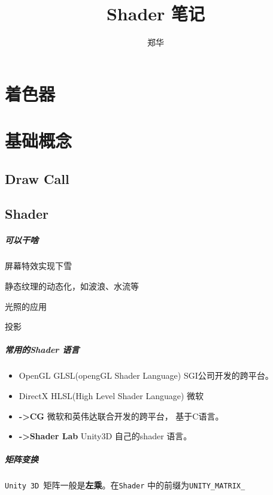 \documentclass[UTF8,a4paper,12pt]{ctexbook}
\author{\kaishu 郑华}
\title{\heiti Shader 笔记}
\begin{document}
 	\maketitle
	\tableofcontents 

\chapter{着色器}
	
	
	
				
\chapter{基础概念}
	
	\section{Draw Call}	

	\section{Shader}
		\paragraph{可以干啥}
		
			屏幕特效实现下雪
			
			静态纹理的动态化，如波浪、水流等
			
			光照的应用
			
			投影
	
		\paragraph{常用的Shader 语言}
				\begin{itemize}
					\item OpenGL GLSL(opengGL Shader Language) SGI公司开发的跨平台。
					\item DirectX  HLSL(High Level Shader Language) 微软
					\item \textbf{->CG} 微软和英伟达联合开发的跨平台， 基于C语言。
					\item \textbf{->Shader Lab} Unity3D 自己的shader 语言。
				\end{itemize}
		
		\paragraph{矩阵变换}
				\verb|Unity 3D |矩阵一般是\textbf{左乘}。在\verb|Shader| 中的前缀为\verb|UNITY_MATRIX_|
				
\end{document}
